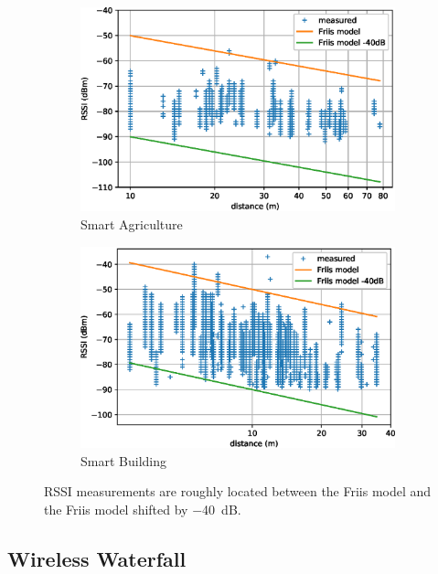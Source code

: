 \documentclass{elsarticle}
\newcommand{\building}            {Smart Building\xspace}
\newcommand{\agri}                {Smart Agriculture\xspace}
\begin{document}
\begin{figure}
    \centering
    \begin{subfigure}[h]{0.49\textwidth}
        \includegraphics[width=\textwidth]{pister_hack_agri.eps}
        \caption{\agri}
    \end{subfigure}
    \begin{subfigure}[h]{0.49\textwidth}  
        \includegraphics[width=\textwidth]{pister_hack_building.eps}
        \caption{\building}
    \end{subfigure} 
    \caption{RSSI measurements are roughly located between the Friis model and the Friis model shifted by $-$40~dB.}
    \label{fig:pister_hack}
\end{figure}

\subsection{Wireless Waterfall}
\label{sec:waterfall}
\end{document}
